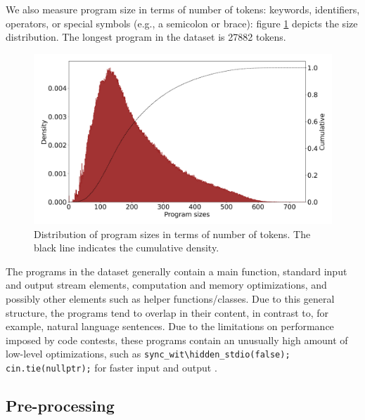 \begin{table}
\centering

\label{tab:statistics_contests_problems}
\endgroup
\end{table}

We also measure program size in terms of number of tokens: keywords, identifiers, operators, or special symbols (e.g., a semicolon or brace): figure \ref{fig:program_sizes}
 depicts the size distribution. 
 The longest program in the dataset is 27882 tokens.

\begin{figure}
    \centering
    \includegraphics[width=\linewidth]{images/program_sizes.png}
    \caption[Distribution of program sizes]{Distribution of program sizes in terms of number of tokens. The black line indicates the cumulative density.}
    \label{fig:program_sizes}
\end{figure}

The programs in the dataset generally contain a main function, standard input and output stream elements, computation and memory optimizations, and possibly other elements such as helper functions/classes. Due to this general structure, the programs tend to overlap in their content, in contrast to, for example, natural language sentences. 
Due to the limitations on performance imposed by code contests, these programs contain an unusually high amount of low-level optimizations, such as \verb|sync_wit\hidden_stdio(false); cin.tie(nullptr);| for faster input and output \cite{FastInputOutput}.

\subsection{Pre-processing}
\label{sec:preprocessing}

